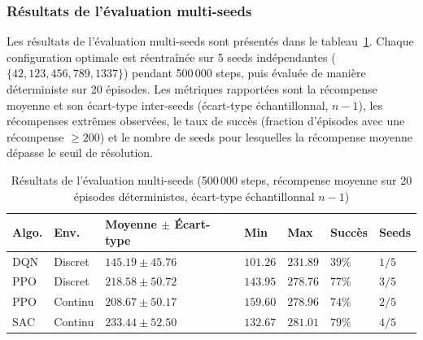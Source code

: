 \subsubsection{Résultats de l'évaluation multi-seeds}
\label{sec:res_eval_finale}

Les résultats de l'évaluation multi-seeds sont présentés dans le
tableau~\ref{tab:eval_finale}. Chaque configuration optimale est réentraînée
sur 5 seeds indépendantes ($\{42, 123, 456, 789, 1337\}$) pendant 500\,000
steps, puis évaluée de manière déterministe sur 20 épisodes. Les métriques
rapportées sont la récompense moyenne et son écart-type inter-seeds (écart-type échantillonnal, $n-1$), les récompenses extrêmes observées, le taux de succès (fraction d'épisodes avec une récompense $\geq 200$) et le nombre de seeds
pour lesquelles la récompense moyenne dépasse le seuil de résolution.

\begin{table}[h!]
\centering
\footnotesize
\setlength{\tabcolsep}{5pt}
\renewcommand{\arraystretch}{1.3}
\caption{Résultats de l'évaluation multi-seeds (500\,000 steps,
         récompense moyenne sur 20 épisodes déterministes, écart-type échantillonnal $n-1$)}
\label{tab:eval_finale}
\newlength{\evalColB}\setlength{\evalColB}{3.2cm}
\newlength{\evalColSide}\setlength{\evalColSide}{1.4cm}
\begin{tabular}{%
  p{1.5cm}%
  p{1.5cm}%
  p{\evalColB}%
  p{\evalColSide}%
  p{\evalColSide}%
  p{\evalColSide}%
  p{\evalColSide}%
}
\toprule
\textbf{Algo.} & \textbf{Env.}
  & \textbf{Moyenne $\pm$ Écart-type}
  & \textbf{Min}
  & \textbf{Max}
  & \textbf{Succès}
  & \textbf{Seeds} \\
\midrule
DQN & Discret  & $145.19 \pm 45.76$ & $101.26$ & $231.89$ & $39\%$ & $1/5$ \\
PPO & Discret  & $218.58 \pm 50.72$ & $143.95$ & $278.76$ & $77\%$ & $3/5$ \\
PPO & Continu  & $208.67 \pm 50.17$ & $159.60$ & $278.96$ & $74\%$ & $2/5$ \\
SAC & Continu  & $233.44 \pm 52.50$ & $132.67$ & $281.01$ & $79\%$ & $4/5$ \\
\bottomrule
\end{tabular}
\end{table}

